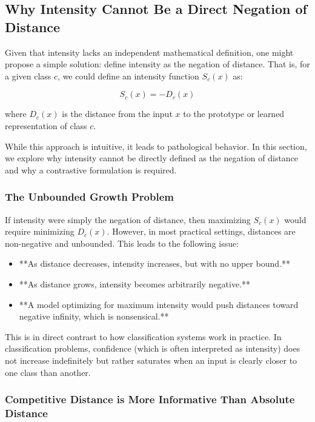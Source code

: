 \subsection{Why Intensity Cannot Be a Direct Negation of Distance}

Given that intensity lacks an independent mathematical definition, one might propose a simple solution: define intensity as the negation of distance. That is, for a given class \( c \), we could define an intensity function \( S_c(x) \) as:

\[
S_c(x) = -D_c(x)
\]

where \( D_c(x) \) is the distance from the input \( x \) to the prototype or learned representation of class \( c \). 

While this approach is intuitive, it leads to pathological behavior. In this section, we explore why intensity cannot be directly defined as the negation of distance and why a contrastive formulation is required.

\subsubsection{The Unbounded Growth Problem}

If intensity were simply the negation of distance, then maximizing \( S_c(x) \) would require minimizing \( D_c(x) \). However, in most practical settings, distances are non-negative and unbounded. This leads to the following issue:

\begin{itemize}
    \item **As distance decreases, intensity increases, but with no upper bound.**
    \item **As distance grows, intensity becomes arbitrarily negative.**
    \item **A model optimizing for maximum intensity would push distances toward negative infinity, which is nonsensical.**
\end{itemize}

This is in direct contrast to how classification systems work in practice. In classification problems, confidence (which is often interpreted as intensity) does not increase indefinitely but rather saturates when an input is clearly closer to one class than another.

\subsubsection{Competitive Distance is More Informative Than Absolute Distance}

